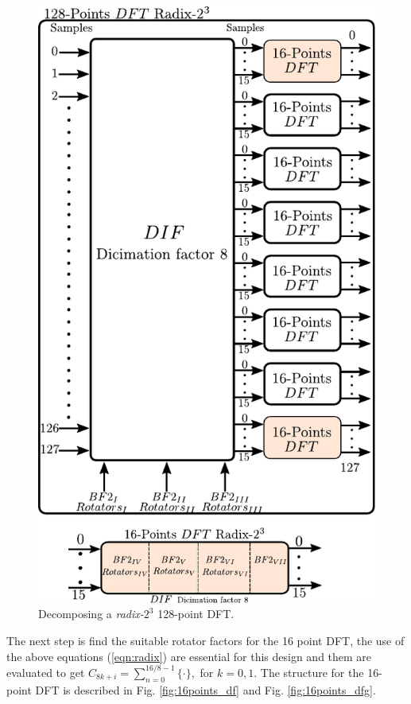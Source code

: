 \documentclass[journal,comsoc]{IEEEtran}
\begin{document}
\begin{figure} 
	\centering
	\includegraphics[width=\linewidth]{Diagramas/miSeccionFiguras/BloquesDft.pdf}
	\caption{Decomposing a \textit{radix-}$2^3$ 128-point DFT.}
	\label{fig:128_block_descomp}
\end{figure}


The next step is find the suitable rotator factors for the 16 point DFT, the use of the above equations (\ref{eqn:radix}) are essential for this design and them are evaluated to get $C_{8k+i} = \sum_{n=0}^{16/8-1} \{ \cdot \}, $ for $k=0,1$. The structure for the 16-point DFT is described in Fig. \ref{fig:16points_df} and Fig. \ref{fig:16points_dfg}. 
\end{document}
